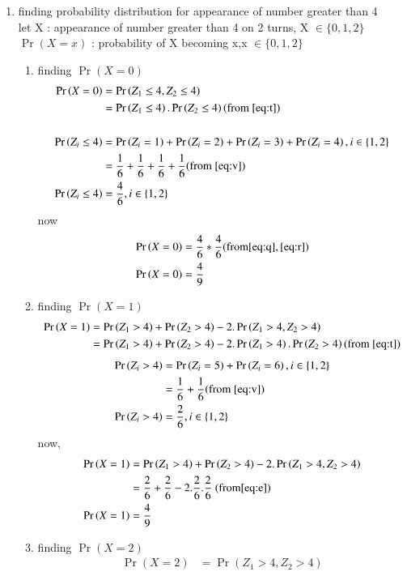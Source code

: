 \documentclass[journal,12pt,onecolumn]{IEEEtran}
\providecommand{\pr}[1]{\ensuremath{\Pr\left(#1\right)}}
\theoremstyle{remark}
\begin{document}
\begin{enumerate}
\item finding probability distribution for appearance of number greater than 4\\
let X : appearance of number greater than 4 on 2 turns,
X $\in \{ 0,1,2 \}$ \\
$\pr{X=x}$ : probability of X becoming x,x $\in \{ 0,1,2 \}$
\begin{enumerate}
\item finding $\pr{X=0}$
\begin{align}
\pr{X=0}&=\pr{Z_1\leq4,Z_2\leq4}\\
&=\pr{Z_1\leq4}.\pr{Z_2\leq4} \label{eq:q}     (\text{from } \eqref{eq:t}) \\\\
\pr{Z_i\leq4}
&=\pr{Z_i=1}+\pr{Z_i=2}+\pr{Z_i=3}+\pr{Z_i=4} ,i\in \{1,2\}\\
&=\frac{1}{6}+\frac{1}{6}+\frac{1}{6}+\frac{1}{6} (\text{from } \eqref{eq:v})\\
\pr{Z_i\leq4}&=\frac{4}{6} ,i\in \{1,2\} \label{eq:r}
\end{align}
now
\begin{align}
\pr{X=0}&=\frac{4}{6}*\frac{4}{6} (\text{from} \eqref{eq:q},\eqref{eq:r})\\
\pr{X=0}&=\frac{4}{9}
\end{align}
\item finding $\pr{X=1}$
\begin{align}
\pr{X=1}&=\pr{Z_1>4}+\pr{Z_2>4}-2.\pr{Z_1>4,Z_2>4}\\
&=\pr{Z_1>4}+\pr{Z_2>4}-2.\pr{Z_1>4}.\pr{Z_2>4}  (\text{from } \eqref{eq:t})
\end{align}
\begin{align}
\pr{Z_i>4}&=\pr{Z_i=5}+\pr{Z_i=6} , i\in \{1,2\} \\
&=\frac{1}{6}+\frac{1}{6} (\text{from } \eqref{eq:v})\\
\pr{Z_i>4}&=\frac{2}{6} ,i\in \{1,2\} \label{eq:e}
\end{align}
now,
\begin{align}
\pr{X=1}&=\pr{Z_1>4}+\pr{Z_2>4}-2.\pr{Z_1>4,Z_2>4}\\
&=\frac{2}{6}+\frac{2}{6}-2.\frac{2}{6}.\frac{2}{6} \ (\text{from} \eqref{eq:e})\\
\pr{X=1}&=\frac{4}{9}
\end{align}
\item finding $\pr{X=2}$
\begin{align}
\pr{X=2}&=\pr{Z_1>4,Z_2>4}\\

\end{align}
\end{enumerate}
\end{enumerate}
\end{document}
